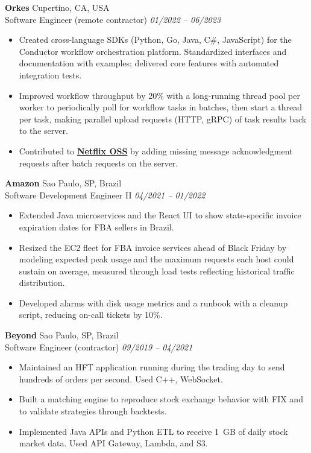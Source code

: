 \documentclass[a4paper,10pt]{article}
\begin{document}
\textbf{Orkes}
    \hfill Cupertino, CA, USA\\
Software Engineer (remote contractor)
    \hfill \textit{01/2022 -- 06/2023}
\begin{itemize}
    \item Created cross-language SDKs (Python, Go, Java, C\#, JavaScript) for the Conductor workflow orchestration platform. Standardized interfaces and documentation with examples; delivered core features with automated integration tests.
    \item Improved workflow throughput by 20\% with a long-running thread pool per worker to periodically poll for workflow tasks in batches, then start a thread per task, making parallel upload requests (HTTP, gRPC) of task results back to the server.
    \item Contributed to \textbf{\href{https://github.com/Netflix/conductor/commit/a13706fc78a3dc040593fd06ae6d9bfc8a7768cf}{Netflix OSS}} by adding missing message acknowledgment requests after batch requests on the server.
\end{itemize}

\textbf{Amazon}
    \hfill Sao Paulo, SP, Brazil\\
Software Development Engineer II
    \hfill \textit{04/2021 -- 01/2022}
\begin{itemize}
    \item Extended Java microservices and the React UI to show state-specific invoice expiration dates for FBA sellers in Brazil.
    \item Resized the EC2 fleet for FBA invoice services ahead of Black Friday by modeling expected peak usage and the maximum requests each host could sustain on average, measured through load tests reflecting historical traffic distribution.
    \item Developed alarms with disk usage metrics and a runbook with a cleanup script, reducing on-call tickets by 10\%.
\end{itemize}

\textbf{Beyond}
    \hfill Sao Paulo, SP, Brazil\\
Software Engineer (contractor)
    \hfill \textit{09/2019 -- 04/2021}
\begin{itemize}
    \item Maintained an HFT application running during the trading day to send hundreds of orders per second. Used C++, WebSocket.
    \item Built a matching engine to reproduce stock exchange behavior with FIX and to validate strategies through backtests.
    \item Implemented Java APIs and Python ETL to receive 1~GB of daily stock market data. Used API Gateway, Lambda, and S3.
\end{itemize}
\end{document}
